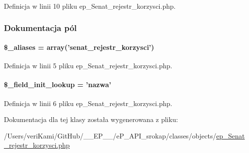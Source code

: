 Definicja w linii 10 pliku ep\-\_\-\-Senat\-\_\-rejestr\-\_\-korzysci.\-php.



\subsubsection{Dokumentacja pól}
\hypertarget{classep___senat__rejestr__korzysci_ab4e31d75f0bc5d512456911e5d01366b}{
\paragraph[{\$\-\_\-aliases}]{\setlength{\rightskip}{0pt plus 5cm}\$\-\_\-aliases = array('senat\-\_\-rejestr\-\_\-korzysci')}}\label{classep___senat__rejestr__korzysci_ab4e31d75f0bc5d512456911e5d01366b}


Definicja w linii 5 pliku ep\-\_\-\-Senat\-\_\-rejestr\-\_\-korzysci.\-php.

\hypertarget{classep___senat__rejestr__korzysci_a4a4d54ae35428077a7c61ec8a5139af3}{
\paragraph[{\$\-\_\-field\-\_\-init\-\_\-lookup}]{\setlength{\rightskip}{0pt plus 5cm}\$\-\_\-field\-\_\-init\-\_\-lookup = 'nazwa'}}\label{classep___senat__rejestr__korzysci_a4a4d54ae35428077a7c61ec8a5139af3}


Definicja w linii 6 pliku ep\-\_\-\-Senat\-\_\-rejestr\-\_\-korzysci.\-php.



Dokumentacja dla tej klasy została wygenerowana z pliku\-:\begin{DoxyCompactItemize}
\item 
/\-Users/veri\-Kami/\-Git\-Hub/\-\_\-\-\_\-\-E\-P\-\_\-\-\_\-/e\-P\-\_\-\-A\-P\-I\-\_\-srokap/classes/objects/\hyperlink{ep___senat__rejestr__korzysci_8php}{ep\-\_\-\-Senat\-\_\-rejestr\-\_\-korzysci.\-php}\end{DoxyCompactItemize}
